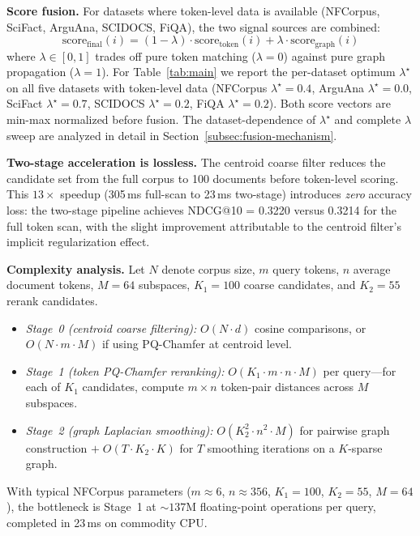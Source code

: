 \documentclass[review,1p]{elsarticle}
\begin{document}
\textbf{Score fusion.} For datasets where token-level data is available (NFCorpus, SciFact, ArguAna, SCIDOCS, FiQA), the two signal sources are combined:
\begin{equation}
\label{eq:fusion}
\text{score}_{\text{final}}(i) = (1 - \lambda) \cdot \text{score}_{\text{token}}(i) + \lambda \cdot \text{score}_{\text{graph}}(i)
\end{equation}
where $\lambda \in [0,1]$ trades off pure token matching ($\lambda=0$) against pure graph propagation ($\lambda=1$). For Table~\ref{tab:main} we report the per-dataset optimum $\lambda^\star$ on all five datasets with token-level data (NFCorpus $\lambda^\star=0.4$, ArguAna $\lambda^\star=0.0$, SciFact $\lambda^\star=0.7$, SCIDOCS $\lambda^\star=0.2$, FiQA $\lambda^\star=0.2$). Both score vectors are min-max normalized before fusion. The dataset-dependence of $\lambda^\star$ and complete $\lambda$ sweep are analyzed in detail in Section~\ref{subsec:fusion-mechanism}.

\textbf{Two-stage acceleration is lossless.} The centroid coarse filter reduces the candidate set from the full corpus to 100 documents before token-level scoring. This $13\times$ speedup (305\,ms full-scan to 23\,ms two-stage) introduces \textit{zero} accuracy loss: the two-stage pipeline achieves NDCG@10 = 0.3220 versus 0.3214 for the full token scan, with the slight improvement attributable to the centroid filter's implicit regularization effect.

\textbf{Complexity analysis.} Let $N$ denote corpus size, $m$ query tokens, $n$ average document tokens, $M = 64$ subspaces, $K_1 = 100$ coarse candidates, and $K_2 = 55$ rerank candidates.
\begin{itemize}[leftmargin=*]
\item \textit{Stage~0 (centroid coarse filtering):} $O(N \cdot d)$ cosine comparisons, or $O(N \cdot m \cdot M)$ if using PQ-Chamfer at centroid level.
\item \textit{Stage~1 (token PQ-Chamfer reranking):} $O(K_1 \cdot m \cdot n \cdot M)$ per query---for each of $K_1$ candidates, compute $m \times n$ token-pair distances across $M$ subspaces.
\item \textit{Stage~2 (graph Laplacian smoothing):} $O(K_2^2 \cdot n^2 \cdot M)$ for pairwise graph construction $+\; O(T \cdot K_2 \cdot K)$ for $T$ smoothing iterations on a $K$-sparse graph.
\end{itemize}

With typical NFCorpus parameters ($m \approx 6$, $n \approx 356$, $K_1 = 100$, $K_2 = 55$, $M = 64$), the bottleneck is Stage~1 at ${\sim}137$M floating-point operations per query, completed in 23\,ms on commodity CPU.
\end{document}
